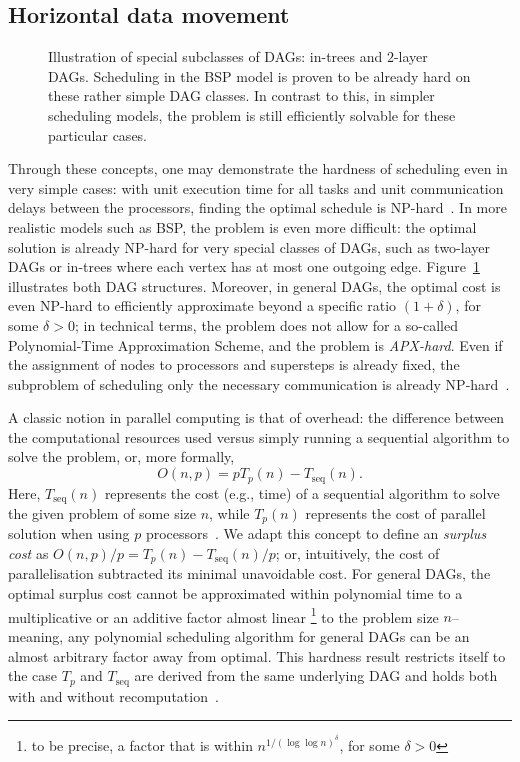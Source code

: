 \documentclass[oneside,reqno, a4paper]{amsart}
\numberwithin{equation}{section}
\begin{document}
\subsection{Horizontal data movement}  %
\label{sec:scheduling-is-hard:horizontal}

\begin{figure}
	\centering
	
	\caption{Illustration of special subclasses of DAGs: in-trees and $2$-layer DAGs. Scheduling in the BSP model is proven to be already hard on these rather simple DAG classes. In contrast to this, in simpler scheduling models, the problem is still efficiently solvable for these particular cases.}
	\label{fig:subclasses}
\end{figure}

Through these concepts, one may demonstrate the hardness of scheduling even in very simple cases: with unit execution time for all tasks and unit communication delays between the processors, finding the optimal schedule is NP-hard~\cite{rayward1987uet}. In more realistic models such as BSP, the problem is even more difficult: the optimal solution is already NP-hard for very special classes of DAGs, such as two-layer DAGs or in-trees where each vertex has at most one outgoing edge. Figure~\ref{fig:subclasses} illustrates both DAG structures.
Moreover, in general DAGs, the optimal cost is even NP-hard to efficiently approximate beyond a specific ratio $(1+\delta)$, for some $\delta>0$; in technical terms, the problem does not allow for a so-called Polynomial-Time Approximation Scheme,
and the problem is \emph{APX-hard}. %
Even if the assignment of nodes to processors and supersteps is already fixed, the subproblem of scheduling only the necessary communication %
is already NP-hard~\cite{BSP_DAG_opdas}.

A classic notion in parallel computing is that of overhead:
the difference between the computational resources used versus simply running a sequential algorithm to solve the problem,
or,
more formally,
$$O(n,p)=pT_p(n)-T_\text{seq}(n).$$
Here,
$T_\text{seq}(n)$ represents the cost (e.g., time) of a sequential algorithm to solve the given problem of some size $n$,
while $T_p(n)$ represents the cost of parallel solution when using $p$ processors~\cite{grama02}.
We adapt this concept to define an \emph{surplus cost} as $O(n,p)/p=T_p(n)-T_\text{seq}(n)/p$;
or, intuitively,
the cost of parallelisation subtracted its minimal unavoidable cost.
For general DAGs,
the optimal surplus cost cannot be approximated within polynomial time to a multiplicative or an additive factor almost linear%
\footnote{to be precise, a factor that is within $n^{1/(\log\log n)^\delta}$, for some $\delta>0$}
to the problem size $n$--
meaning, any polynomial scheduling algorithm for general DAGs can be an almost arbitrary factor away from optimal.
This hardness result restricts itself to the case $T_p$ and $T_\text{seq}$ are derived from the same underlying DAG
and holds both with and without recomputation~\cite{BSP_DAG_opdas,replication_opdas}.
\end{document}
